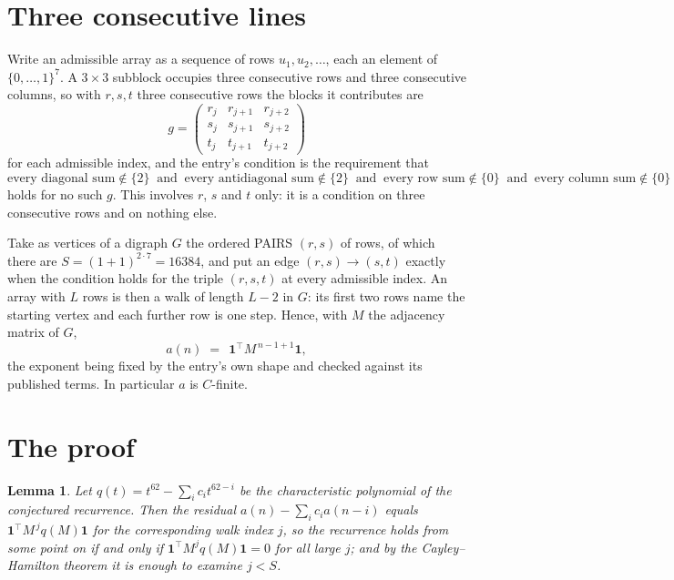 \documentclass[11pt,a4paper]{article}
\theoremstyle{plain}
\newtheorem{lemma}[theorem]{Lemma}
\theoremstyle{definition}
\begin{document}
\section{Three consecutive lines}

Write an admissible array as a sequence of rows $u_1,u_2,\dots$, each an element of
$\{0,\dots,1\}^{7}$. A $3\times3$ subblock occupies three consecutive rows and
three consecutive columns, so with $r,s,t$ three consecutive rows the blocks it
contributes are
\[
g=\begin{pmatrix}r_j&r_{j+1}&r_{j+2}\\ s_j&s_{j+1}&s_{j+2}\\ t_j&t_{j+1}&t_{j+2}\end{pmatrix}
\]
for each admissible index, and the entry's condition is the requirement that
\[
\text{every diagonal sum} \notin \{2\}\ \text{ and }\ \text{every antidiagonal sum} \notin \{2\}\ \text{ and }\ \text{every row sum} \notin \{0\}\ \text{ and }\ \text{every column sum} \notin \{0\}
\]
holds for no such $g$. This involves $r$, $s$ and $t$ only: it is a condition on
three consecutive rows and on nothing else.

Take as vertices of a digraph $G$ the ordered PAIRS $(r,s)$ of rows, of which there are
$S=(1+1)^{2\cdot7}=16384$, and put an edge $(r,s)\to(s,t)$ exactly when the condition
holds for the triple $(r,s,t)$ at every admissible index. An array with $L$ rows is then a
walk of length $L-2$ in $G$: its first two rows name the starting vertex and each further
row is one step. Hence, with $M$ the adjacency matrix of $G$,
\[
a(n)\;=\;\,\mathbf{1}^{\!\top}M^{\,n-1+1}\mathbf{1},
\]
the exponent being fixed by the entry's own shape and checked against its published terms.
In particular $a$ is $C$-finite.

\section{The proof}

\begin{lemma}\label{lem:crit}
Let $q(t)=t^{62}-\sum_i c_it^{62-i}$ be the characteristic polynomial of the
conjectured recurrence. Then the residual $a(n)-\sum_ic_ia(n-i)$ equals
$\mathbf{1}^{\!\top}M^{\,j}q(M)\mathbf{1}$ for the corresponding walk index
$j$, so the recurrence holds from some point on if and only if
$\mathbf{1}^{\!\top}M^{j}q(M)\mathbf{1}=0$ for all large $j$; and by the
Cayley--Hamilton theorem it is enough to examine $j<S$.
\end{lemma}
\end{document}
